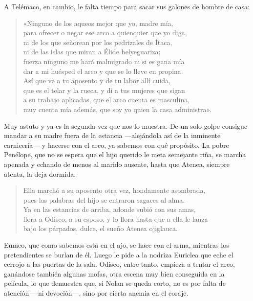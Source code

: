 A Telémaco, en cambio, le falta tiempo para sacar sus galones de hombre de casa:

\begin{verse}
«Ninguno de los aqueos mejor que yo, madre mía,\\
para ofrecer o negar ese arco a quienquier que yo diga,\\
ni de los que señorean por los pedrizales de Ítaca,\\
ni de las islas que miran a Élide belyeguariza;\\
fuerza ninguno me hará malmigrado ni si es gana mía\\
dar a mi huésped el arco y que se lo lleve en propina.\\
Así que ve a tu aposento y de tu labor allí cuida,\\
que es el telar y la rueca, y di a tus mujeres que sigan\\
a su trabajo aplicadas, que el arco cuenta es masculina,\\
muy cuenta mía además, que soy yo quien la casa administra».
\end{verse}

Muy astuto y ya es la segunda vez que nos lo muestra. De un solo golpe consigue mandar a su madre fuera de la estancia ---alejándola así de la inminente carnicería--- y hacerse con el arco, ya sabemos con qué propósito. La pobre Penélope, que no se espera que el hijo querido le meta semejante riña, se marcha apenada y echando de menos al marido ausente, hasta que Atenea, siempre atenta, la deja dormida:

\begin{verse}
Ella marchó a su aposento otra vez, hondamente asombrada,\\
pues las palabras del hijo se entraron sagaces al alma.\\
Ya en las estancias de arriba, adonde subió con sus amas,\\
llora a Odiseo, a su esposo, y lo llora hasta que a ella le lanza\\
bajo los párpados, dulce, el sueño Atenea ojiglauca.
\end{verse}

Eumeo, que como sabemos está en el ajo, se hace con el arma, mientras los pretendientes se burlan de él. Luego le pide a la nodriza Euriclea que eche el cerrojo a las puertas de la sala. Odiseo, entre tanto, empieza a tentar el arco, ganándose también algunas mofas, otra escena muy bien conseguida en la película, lo que demuestra que, si Nolan se queda corto, no es por falta de atención ---ni devoción---, sino por cierta anemia en el coraje.

